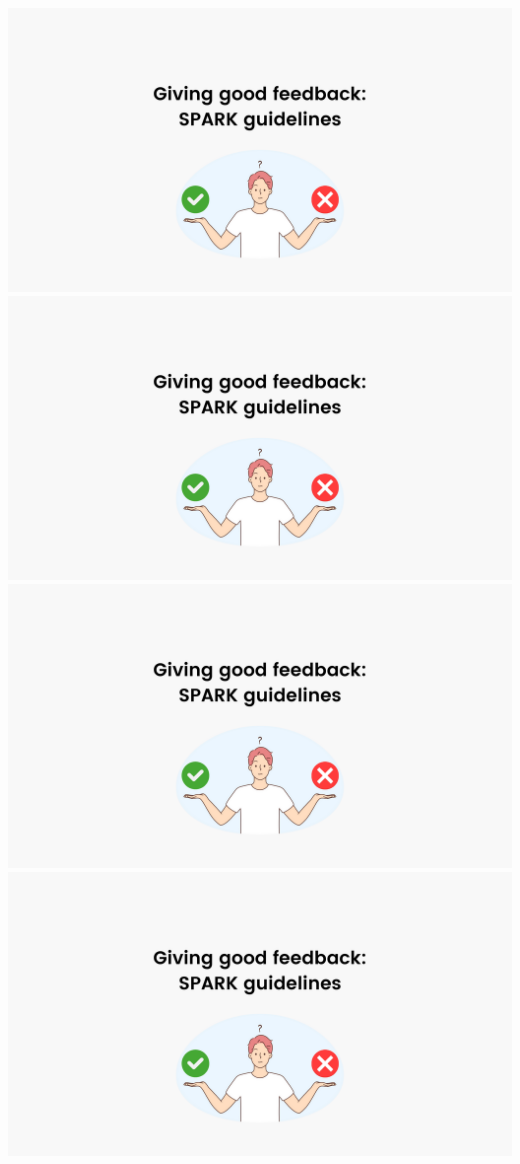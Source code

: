 \vfil
\includegraphics[page=5,width=\textwidth]{resources/tutorial-05-WorkshopFeedbackSPARK.pdf}
\vfil
\includegraphics[page=6,width=\textwidth]{resources/tutorial-05-WorkshopFeedbackSPARK.pdf}
\vfil
\includegraphics[page=7,width=\textwidth]{resources/tutorial-05-WorkshopFeedbackSPARK.pdf}
\vfil
\includegraphics[page=8,width=\textwidth]{resources/tutorial-05-WorkshopFeedbackSPARK.pdf}


	
	
